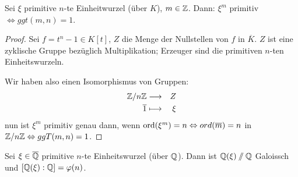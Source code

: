 \documentclass[12pt,a4paper]{scrartcl}
\begin{document}
\begin{lem}\label{lem:24.3}%
	Sei $\xi$ primitive $n$-te Einheitwurzel (über $K$), $m\in\mathbb Z$. Dann: $\xi^m$ primitiv $\Leftrightarrow ggt(m,n) = 1$.
\end{lem}

\begin{proof}
	Sei $f = t^n-1\in K[t]$, $Z$ die Menge der Nullstellen von $f$ in $\overline{K}$. $Z$ ist eine zyklische Gruppe bezüglich Multiplikation; Erzeuger sind die primitiven $n$-ten Einheitswurzeln.
	
	Wir haben also einen Isomorphismus von Gruppen:
	\begin{eqnarray*}
		\mathbb Z/n\mathbb Z &\longrightarrow & Z\\
		\overline{1}&\longmapsto & \xi
	\end{eqnarray*}
	nun ist $\xi^m$ primitiv genau dann, wenn $\operatorname{ord}(\xi^m) = n \Leftrightarrow ord(\overline{m}) = n$ in $\mathbb Z/n\mathbb Z \Leftrightarrow ggT(m,n) = 1$.
\end{proof}
\begin{satz}\label{thm:24.4}
	Sei $\xi\in\overline{\mathbb Q}$ primitive $n$-te Einheitswurzel (über $\mathbb Q$). Dann ist $\mathbb Q(\xi)\sslash\mathbb Q$ Galoissch und $[\mathbb Q(\xi):\mathbb Q] = \varphi(n)$.
\end{satz}
\end{document}
